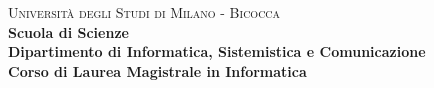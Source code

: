 \setlength\intextsep{0pt}

    \begin{titlepage}
        
        \noindent
        \begin{minipage}[t]{0.19\textwidth}
        \end{minipage}
        \begin{minipage}[t]{0.81\textwidth}
        {
                {\textsc{Università degli Studi di Milano - Bicocca}} \\
                \textbf{Scuola di Scienze} \\
                \textbf{Dipartimento di Informatica, Sistemistica e Comunicazione} \\
                \textbf{Corso di Laurea Magistrale in Informatica} \\
                \par
        }
        \end{minipage}
        
	\vspace{40mm}
        

\end{titlepage}
